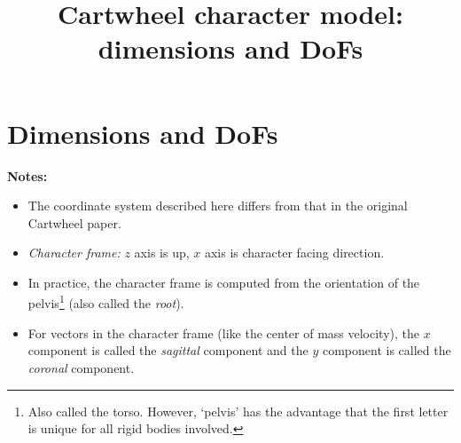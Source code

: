 \documentclass[a4paper]{article}
\title{Cartwheel character model: dimensions and DoFs}
\begin{document}



\pgfmathsetmacro{\shankSizeZ}{\legSizeZ * \kneeRelativePosZ}
\pgfmathsetmacro{\thighSizeZ}{\legSizeZ - \shankSizeZ}

\pgfmathsetmacro{\anklePosZ}{\footSizeZ}
\pgfmathsetmacro{\kneePosZ}{\anklePosZ + \legSizeZ * \kneeRelativePosZ}
\pgfmathsetmacro{\hipPosZ}{\anklePosZ + \legSizeZ}



\maketitle
\section{Dimensions and DoFs}
\textbf{Notes:}
\begin{itemize}
\item The coordinate system described here differs from that in the original Cartwheel paper.
\item \textit{Character frame:} $z$ axis is up, $x$ axis is character facing direction.
\item In practice, the character frame is computed from the orientation of the pelvis\footnote{Also called the torso. However, `pelvis' has the advantage that the first letter is unique for all rigid bodies involved.} (also called the \textit{root}).
\item For vectors in the character frame (like the center of mass velocity), the $x$ component is called the \textit{sagittal} component and the $y$ component is called the \textit{coronal} component.
\end{itemize}
\end{document}

